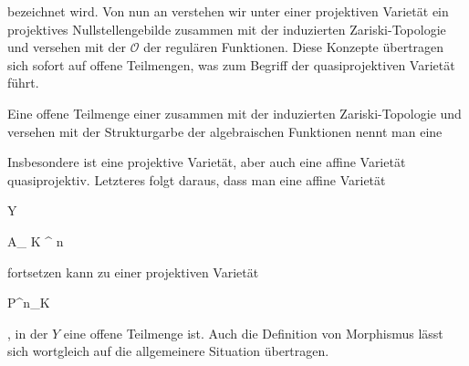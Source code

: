  bezeichnet wird. Von nun an verstehen wir unter einer projektiven Varietät ein projektives Nullstellengebilde zusammen mit der induzierten Zariski-Topologie und versehen mit der  {} ${\mathcal O}$ der regulären Funktionen. Diese Konzepte übertragen sich sofort auf offene Teilmengen, was zum Begriff der quasiprojektiven Varietät führt.



{}

{


Eine offene Teilmenge einer
zusammen mit der induzierten Zariski-Topologie und versehen mit der Strukturgarbe der algebraischen Funktionen nennt man eine 


}


Insbesondere ist eine projektive Varietät, aber auch eine affine Varietät quasiprojektiv. Letzteres folgt daraus, dass man eine affine Varietät


\mavergleichskette

{\vergleichskette

{Y
}

{ \subseteq }{ { {\mathbb A}_{ K }^{ n  } }
}

{  }{
}

{    }{
}

{   }{
}

}
{}{}{}
fortsetzen kann zu einer projektiven Varietät


\mavergleichskette

{\vergleichskette

{ 
}

{ \subseteq }{ {\mathbb P}^{n}_{K}
}

{  }{
}

{    }{
}

{   }{
}

}
{}{}{,}
in der $Y$ eine offene Teilmenge ist. Auch die Definition von Morphismus lässt sich wortgleich auf die allgemeinere Situation übertragen.



{}

